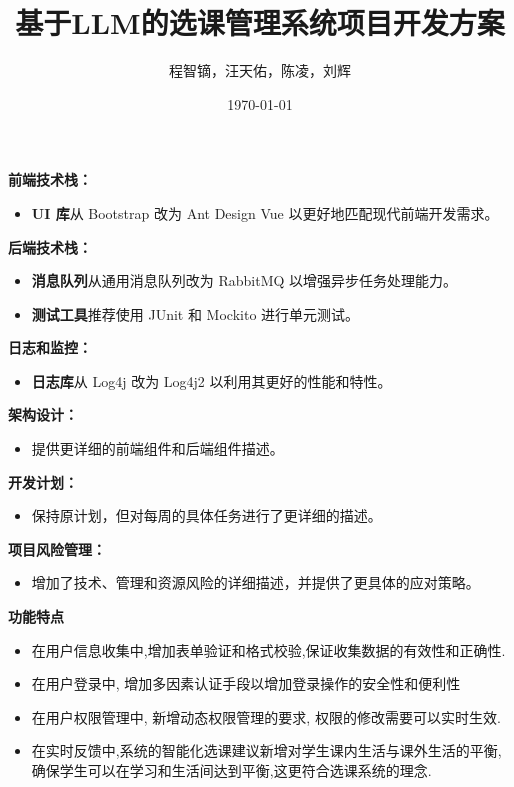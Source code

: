 \documentclass{article}
\title{基于LLM的选课管理系统项目开发方案}
\author{程智镝，汪天佑，陈凌，刘辉}
\date{\today}
\begin{document}
\maketitle

\textbf{前端技术栈：}
\begin{itemize}
    \item \textbf{UI 库}从 Bootstrap 改为 Ant Design Vue 以更好地匹配现代前端开发需求。
\end{itemize}

\textbf{后端技术栈：}
\begin{itemize}
    \item \textbf{消息队列}从通用消息队列改为 RabbitMQ 以增强异步任务处理能力。
    \item \textbf{测试工具}推荐使用 JUnit 和 Mockito 进行单元测试。
\end{itemize}

\textbf{日志和监控：}
\begin{itemize}
    \item \textbf{日志库}从 Log4j 改为 Log4j2 以利用其更好的性能和特性。
\end{itemize}

\textbf{架构设计：}
\begin{itemize}
    \item 提供更详细的前端组件和后端组件描述。
\end{itemize}

\textbf{开发计划：}
\begin{itemize}
    \item 保持原计划，但对每周的具体任务进行了更详细的描述。
\end{itemize}

\textbf{项目风险管理：}
\begin{itemize}
    \item 增加了技术、管理和资源风险的详细描述，并提供了更具体的应对策略。
\end{itemize}

\textbf{功能特点}
\begin{itemize}
        \item 在用户信息收集中,增加表单验证和格式校验,保证收集数据的有效性和正确性.
        \item 在用户登录中, 增加多因素认证手段以增加登录操作的安全性和便利性
        \item 在用户权限管理中, 新增动态权限管理的要求, 权限的修改需要可以实时生效.
        \item 在实时反馈中,系统的智能化选课建议新增对学生课内生活与课外生活的平衡,确保学生可以在学习和生活间达到平衡,这更符合选课系统的理念.
\end{itemize}
\end{document}
